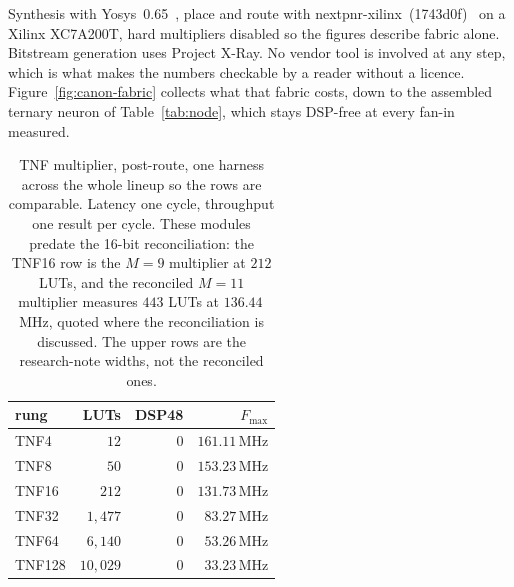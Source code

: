 \documentclass[11pt]{article}
\theoremstyle{definition}
\begin{document}
Synthesis with Yosys~0.65~\cite{yosys}, place and route with
nextpnr-xilinx~(1743d0f)~\cite{nextpnr} on a
Xilinx XC7A200T, hard multipliers disabled so the figures describe fabric alone.
Bitstream generation uses Project X-Ray. No vendor tool is involved at any step,
which is what makes the numbers checkable by a reader without a licence.
Figure~\ref{fig:canon-fabric} collects what that fabric costs, down to the
assembled ternary neuron of Table~\ref{tab:node}, which stays DSP-free at every
fan-in measured.

\begin{table}[t]\centering
\caption{TNF multiplier, post-route, one harness across the whole lineup so the
rows are comparable. Latency one cycle, throughput one result per cycle. These
modules predate the 16-bit reconciliation: the TNF16 row is the $M = 9$ multiplier
at $212$ LUTs, and the reconciled $M = 11$ multiplier measures $443$ LUTs at
$136.44$\,MHz, quoted where the reconciliation is discussed. The upper rows are the
research-note widths, not the reconciled ones.}
\label{tab:ladder}
\begin{tabular}{lrrr}
\toprule
rung & LUTs & DSP48 & $F_{\max}$ \\
\midrule
TNF4  & $12$      & $0$ & $161.11$\,MHz \\
TNF8  & $50$      & $0$ & $153.23$\,MHz \\
TNF16 & $212$     & $0$ & $131.73$\,MHz \\
TNF32  & $1{,}477$  & $0$ & $83.27$\,MHz \\
TNF64  & $6{,}140$  & $0$ & $53.26$\,MHz \\
TNF128 & $10{,}029$ & $0$ & $33.23$\,MHz \\
\bottomrule
\end{tabular}
\end{table}
\end{document}
